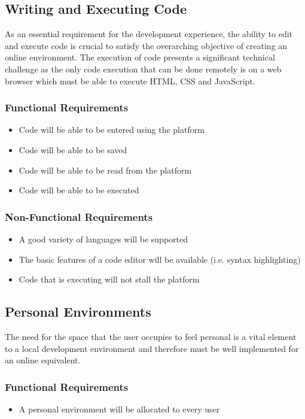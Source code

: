 \subsection{Writing and Executing Code}
As an essential requirement for the development experience, the ability to edit and execute code is crucial to satisfy the overarching objective of creating an online environment. The execution of code presents a significant technical challenge as the only code execution that can be done remotely is on a web browser which must be able to execute HTML, CSS and JavaScript.

\subsubsection{Functional Requirements}
\begin{itemize}
    \setlength{\itemsep}{0em}
    \item Code will be able to be entered using the platform
    \item Code will be able to be saved
    \item Code will be able to be read from the platform
    \item Code will be able to be executed
\end{itemize}
\subsubsection{Non-Functional Requirements}
\begin{itemize}
    \setlength{\itemsep}{0em}
    \item A good variety of languages will be supported
    \item The basic features of a code editor will be available (i.e. syntax highlighting)
    \item Code that is executing will not stall the platform
\end{itemize}

\subsection{Personal Environments}
The need for the space that the user occupies to feel personal is a vital element to a local development environment and therefore must be well implemented for an online equivalent.

\subsubsection{Functional Requirements}
\begin{itemize}
    \setlength{\itemsep}{0em}
    \item A personal environment will be allocated to every user
\end{itemize}
